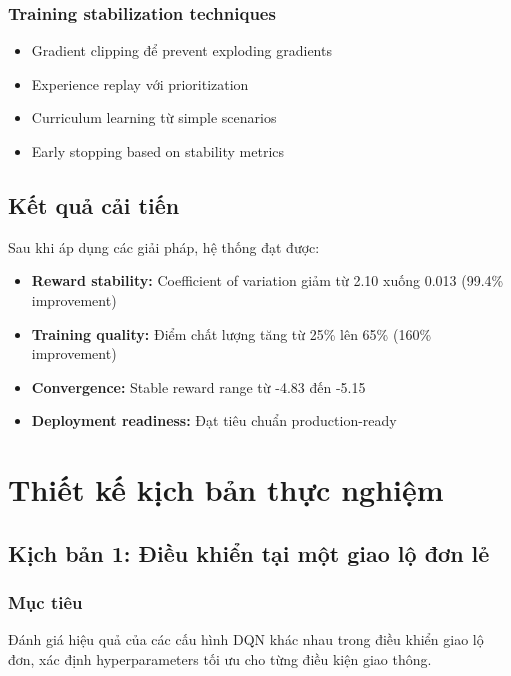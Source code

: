 \subsubsection{Training stabilization techniques}
\begin{itemize}
    \item Gradient clipping để prevent exploding gradients

    \item Experience replay với prioritization

    \item Curriculum learning từ simple scenarios

    \item Early stopping based on stability metrics
\end{itemize}

\subsection{Kết quả cải tiến}
Sau khi áp dụng các giải pháp, hệ thống đạt được:
\begin{itemize}
    \item \textbf{Reward stability:} Coefficient of variation giảm từ 2.10 xuống
        0.013 (99.4\% improvement)

    \item \textbf{Training quality:} Điểm chất lượng tăng từ 25\% lên 65\% (160\%
        improvement)

    \item \textbf{Convergence:} Stable reward range từ -4.83 đến -5.15

    \item \textbf{Deployment readiness:} Đạt tiêu chuẩn production-ready
\end{itemize}

\section{Thiết kế kịch bản thực nghiệm}

\subsection{Kịch bản 1: Điều khiển tại một giao lộ đơn lẻ}
\subsubsection{Mục tiêu}
Đánh giá hiệu quả của các cấu hình DQN khác nhau trong điều khiển giao lộ đơn, xác
định hyperparameters tối ưu cho từng điều kiện giao thông.

